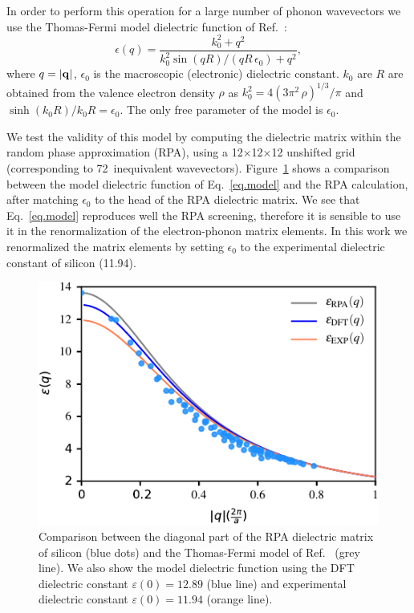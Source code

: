 \documentclass[aps,prl,twocolumn,superscriptaddress]{revtex4-1}
\begin{document}
In order to perform this operation for a large number of phonon wavevectors
we use the Thomas-Fermi model dielectric function of Ref.~:
  \begin{equation}\label{eq.model}
  \epsilon(q) = \frac{k_0^2+q^2}{k_0^2 \sin (qR)/(qR\,\epsilon_0) + q^2 },
  \end{equation}
where $q=|{\bf q}|$, $\epsilon_0$ is the macroscopic (electronic) dielectric constant. $k_0$ are $R$ are obtained from the valence electron density $\rho$ as 
$k_0^2 = 4(3\pi^2 \, \rho)^{1/3}/\pi$ and $\sinh (k_0R)/k_0R = \epsilon_0$. The only free parameter of the model is $\epsilon_0$. 

We test the validity of this model by computing the dielectric matrix within the random phase approximation (RPA),
using a 12$\times$12$\times$12 unshifted grid (corresponding to 72~inequivalent wavevectors).
Figure~\ref{figS3} shows a comparison between the model dielectric function of Eq.~\eqref{eq.model} 
and the RPA calculation,
after matching $\epsilon_0$ to the head of the RPA dielectric matrix. We see that Eq.~\eqref{eq.model} reproduces well the RPA
screening, therefore it is sensible to use it in the renormalization of the electron-phonon
matrix elements. In this work we renormalized the matrix elements by setting $\epsilon_0$ to the
experimental dielectric constant of silicon (11.94). 

\begin{figure}
  \centering
  \includegraphics[width=\columnwidth]{figS3.pdf}
  \caption{\label{figS3}
  Comparison between the diagonal part of the RPA dielectric matrix of silicon (blue dots) and the Thomas-Fermi
  model of Ref.~ (grey line). 
  We also show the model dielectric function using the DFT dielectric constant $\varepsilon(0)=12.89$ (blue line) and 
  experimental dielectric constant $\varepsilon(0)=11.94$ (orange line).
  }
\end{figure}
\end{document}
